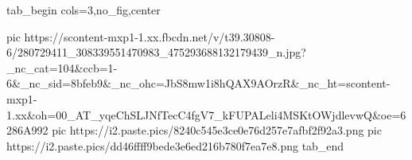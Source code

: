  
 
 
 
 

\ifcmt
  tab_begin cols=3,no_fig,center

     pic https://scontent-mxp1-1.xx.fbcdn.net/v/t39.30808-6/280729411_308339551470983_475293688132179439_n.jpg?_nc_cat=104&ccb=1-6&_nc_sid=8bfeb9&_nc_ohc=JbS8mw1i8hQAX9AOrzR&_nc_ht=scontent-mxp1-1.xx&oh=00_AT_yqeChSLJNfTecC4fgV7_kFUPALeli4MSKtOWjdlevwQ&oe=6286A992
     pic https://i2.paste.pics/8240c545e3ce0e76d257e7afbf2f92a3.png
     pic https://i2.paste.pics/dd46ffff9bede3e6ed216b780f7ea7e8.png
  tab_end
\fi

